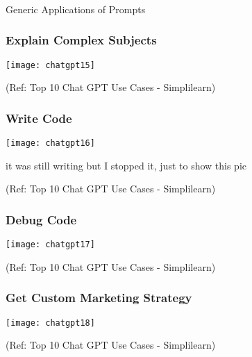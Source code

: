 
\begin{frame}[fragile]\frametitle{}
\begin{center}
{\Large Generic Applications of Prompts}
\end{center}
\end{frame}


\begin{frame}[fragile]\frametitle{Explain Complex Subjects}
\begin{center}
\texttt{[image: chatgpt15]}
\end{center}
	
{\tiny (Ref: Top 10 Chat GPT Use Cases - Simplilearn)}
\end{frame}

\begin{frame}[fragile]\frametitle{Write Code}
\begin{center}
\texttt{[image: chatgpt16]}
\end{center}

it was still writing but I stopped it, just to show this pic

{\tiny (Ref: Top 10 Chat GPT Use Cases - Simplilearn)}
\end{frame}

\begin{frame}[fragile]\frametitle{Debug Code}
\begin{center}
\texttt{[image: chatgpt17]}
\end{center}

{\tiny (Ref: Top 10 Chat GPT Use Cases - Simplilearn)}
\end{frame}

\begin{frame}[fragile]\frametitle{Get Custom Marketing Strategy}
\begin{center}
\texttt{[image: chatgpt18]}
\end{center}

{\tiny (Ref: Top 10 Chat GPT Use Cases - Simplilearn)}
\end{frame}


